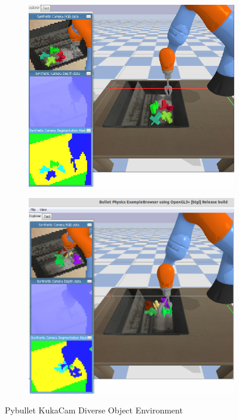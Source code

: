 \documentclass{article}
\begin{document}
\begin{figure}[H]
\centering
\begin{subfigure}{.5\textwidth}
  \centering
  \includegraphics[scale=0.32]{kuka_env1}
\end{subfigure}%
\begin{subfigure}{.5\textwidth}
  \centering
  \includegraphics[scale=0.20]{kuka}
\end{subfigure}
\caption{Pybullet KukaCam Diverse Object Environment}
\label{envfig}
\end{figure}
\end{document}
